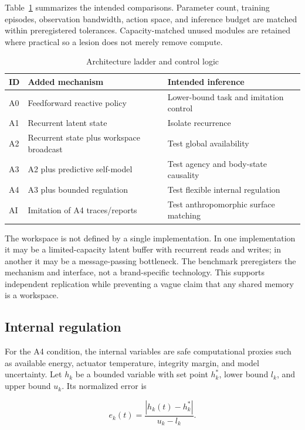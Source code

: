 \documentclass[conference]{IEEEtran}
\begin{document}
Table~\ref{tab:arch} summarizes the intended comparisons. Parameter count, training episodes, observation bandwidth, action space, and inference budget are matched within preregistered tolerances. Capacity-matched unused modules are retained where practical so a lesion does not merely remove compute.

\begin{table}[t]
\caption{Architecture ladder and control logic}
\label{tab:arch}
\centering
\scriptsize
\begin{tabular}{p{}p{}p{}}
\toprule
ID & Added mechanism & Intended inference \\
\midrule
A0 & Feedforward reactive policy & Lower-bound task and imitation control \\
A1 & Recurrent latent state & Isolate recurrence \\
A2 & Recurrent state plus workspace broadcast & Test global availability \\
A3 & A2 plus predictive self-model & Test agency and body-state causality \\
A4 & A3 plus bounded regulation & Test flexible internal regulation \\
AI & Imitation of A4 traces/reports & Test anthropomorphic surface matching \\
\bottomrule
\end{tabular}
\end{table}

The workspace is not defined by a single implementation. In one implementation it may be a limited-capacity latent buffer with recurrent reads and writes; in another it may be a message-passing bottleneck. The benchmark preregisters the mechanism and interface, not a brand-specific technology. This supports independent replication while preventing a vague claim that any shared memory is a workspace.

\subsection{Internal regulation}

For the A4 condition, the internal variables are safe computational proxies such as available energy, actuator temperature, integrity margin, and model uncertainty. Let $h_k$ be a bounded variable with set point $h_k^*$, lower bound $l_k$, and upper bound $u_k$. Its normalized error is

\begin{equation}
e_k(t)=\frac{|h_k(t)-h_k^*|}{u_k-l_k}.
\end{equation}
\end{document}
